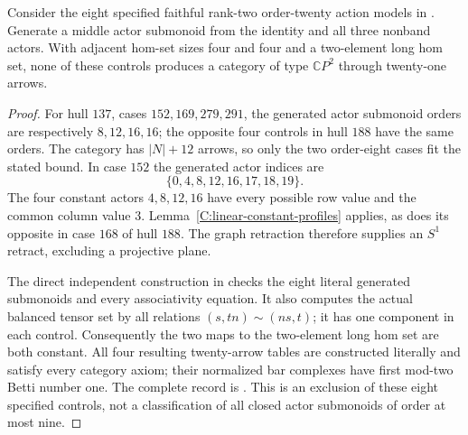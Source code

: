 \begin{corollary}
\label{C:rank-two-closed-actor-controls}
Consider the eight specified faithful rank-two order-twenty
action models in
.
Generate a middle actor submonoid from the identity and all
three nonband actors. With adjacent hom-set sizes four and
four and a two-element long hom set, none of these controls
produces a category of type $\mathbb CP^2$ through twenty-one
arrows.
\end{corollary}
\begin{proof}
For hull $137$, cases $152,169,279,291$, the generated actor
submonoid orders are respectively $8,12,16,16$; the opposite
four controls in hull $188$ have the same orders. The category
has $|N|+12$ arrows, so only the two order-eight cases fit the
stated bound. In case $152$ the generated actor indices are
\[
 \{0,4,8,12,16,17,18,19\}.
\]
The four constant actors $4,8,12,16$ have every possible row
value and the common column value $3$.
Lemma~\ref{C:linear-constant-profiles} applies, as does its
opposite in case $168$ of hull $188$. The graph retraction
therefore supplies an $S^1$ retract, excluding a projective plane.

The direct independent construction in
 checks the eight
literal generated submonoids and every associativity equation.
It also computes the actual balanced tensor set by all relations
$(s,tn)\sim(ns,t)$; it has one component in each control.
Consequently the two maps to the two-element long hom set are
both constant. All four resulting twenty-arrow tables are
constructed literally and satisfy every category axiom; their
normalized bar complexes have first mod-two Betti number one.
The complete record is
.
This is an exclusion of these eight specified controls, not a
classification of all closed actor submonoids of order at most nine.
\end{proof}
